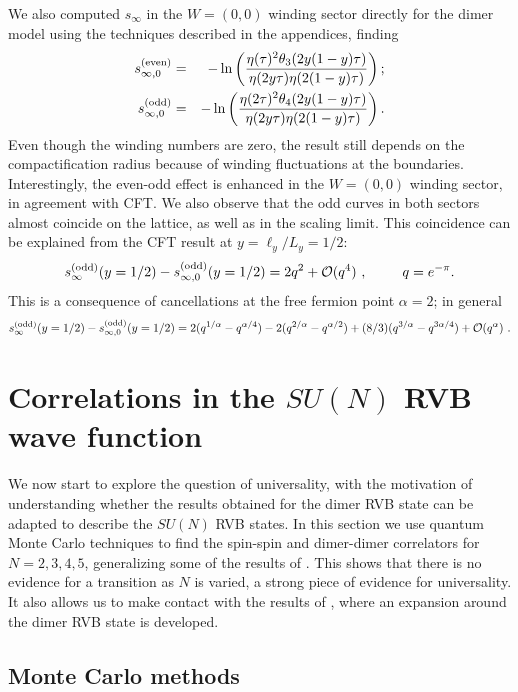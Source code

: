 \documentclass[11pt]{iopart}
\begin{document}
We also computed $s_\infty$ in the $W=(0,0)$ winding sector directly for the dimer model using the techniques described in the appendices, finding
\begin{eqnarray}\label{eq:cft_w0}
 s_{\infty,0}^{\rm (even)}&=&-\ln \left(\frac{\eta(\tau)^2\theta_3(2y(1-y)\tau)}{\eta(2y\tau)\eta(2(1-y)\tau)}\right);\\\label{eq:cft_w0_odd}
 s_{\infty,0}^{\rm (odd)}&=&-\ln \left(\frac{\eta(2\tau)^2\theta_4(2y(1-y)\tau)}{\eta(2y\tau)\eta(2(1-y)\tau)}\right).
\end{eqnarray}
Even though the winding numbers are zero, the result still depends on the compactification radius because of winding fluctuations at the boundaries. 
Interestingly, the even-odd effect is enhanced in the $W=(0,0)$ winding sector, in agreement with CFT. We also observe that the odd curves in both sectors almost coincide on the lattice, as well as in the scaling limit. This coincidence can be explained from the CFT result at $y=\ell_y/L_y=1/2$:
\begin{equation}
 s_{\infty}^{\rm (odd)}(y=1/2)-s_{\infty,0}^{\rm (odd)}(y=1/2)=2q^2+\mathcal{O}(q^4) \ ,\qquad q=e^{-\pi}.
\end{equation}
This is a consequence of cancellations at the free fermion point $\alpha=2$; in general $$
 s_{\infty}^{\rm (odd)}(y=1/2)-s_{\infty,0}^{\rm (odd)}(y=1/2)=2(q^{1/\alpha}-q^{\alpha/4})-2(q^{2/\alpha}-q^{\alpha/2})+(8/3)(q^{3/\alpha}-q^{3\alpha/4})+\mathcal{O}(q^{\alpha})\ .$$


\section{Correlations in the $SU(N)$ RVB wave function}
\label{sec:correlations}
We now start to explore the question of universality, with the motivation of understanding whether the results obtained for the dimer RVB state can be adapted to describe the $SU(N)$ RVB states. In this section we use quantum Monte Carlo techniques to find the spin-spin and dimer-dimer correlators for $N=2,3,4,5$, generalizing some of the results of \cite{RVB1,RVB2}. This shows that there is no evidence for a transition as $N$ is varied, a strong piece of evidence for universality. It also allows us to make contact with the results of \cite{Damle}, where an expansion around the dimer RVB state is developed.


\subsection{Monte Carlo methods}
\label{sec:numerics}
\end{document}
